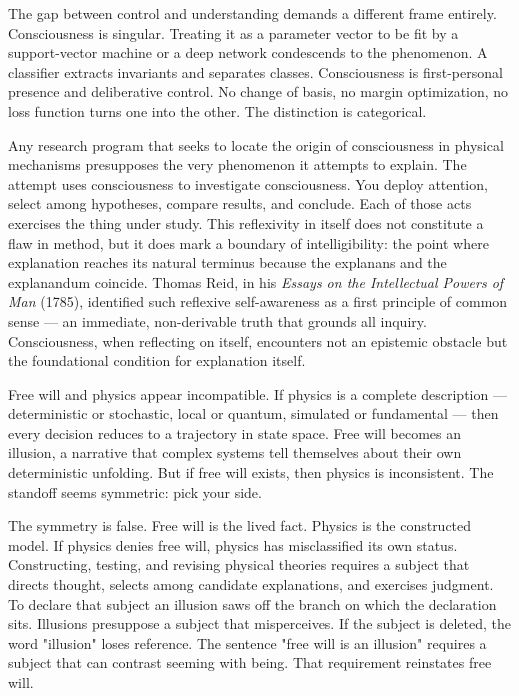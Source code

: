 The gap between control and understanding demands a different frame entirely. Consciousness is singular. Treating it as a parameter vector to be fit by a support-vector machine or a deep network condescends to the phenomenon. A classifier extracts invariants and separates classes. Consciousness is first-personal presence and deliberative control. No change of basis, no margin optimization, no loss function turns one into the other. The distinction is categorical.

Any research program that seeks to locate the origin of consciousness in physical mechanisms presupposes the very phenomenon it attempts to explain. The attempt uses consciousness to investigate consciousness. You deploy attention, select among hypotheses, compare results, and conclude. Each of those acts exercises the thing under study. This reflexivity in itself does not constitute a flaw in method, but it does mark a boundary of intelligibility: the point where explanation reaches its natural terminus because the explanans and the explanandum coincide. Thomas Reid, in his \textit{Essays on the Intellectual Powers of Man} (1785), identified such reflexive self-awareness as a first principle of common sense — an immediate, non-derivable truth that grounds all inquiry. Consciousness, when reflecting on itself, encounters not an epistemic obstacle but the foundational condition for explanation itself.

Free will and physics appear incompatible. If physics is a complete description — deterministic or stochastic, local or quantum, simulated or fundamental — then every decision reduces to a trajectory in state space. Free will becomes an illusion, a narrative that complex systems tell themselves about their own deterministic unfolding. But if free will exists, then physics is inconsistent. The standoff seems symmetric: pick your side.

The symmetry is false. Free will is the lived fact. Physics is the constructed model. If physics denies free will, physics has misclassified its own status. Constructing, testing, and revising physical theories requires a subject that directs thought, selects among candidate explanations, and exercises judgment. To declare that subject an illusion saws off the branch on which the declaration sits. Illusions presuppose a subject that misperceives. If the subject is deleted, the word "illusion" loses reference. The sentence "free will is an illusion" requires a subject that can contrast seeming with being. That requirement reinstates free will.


